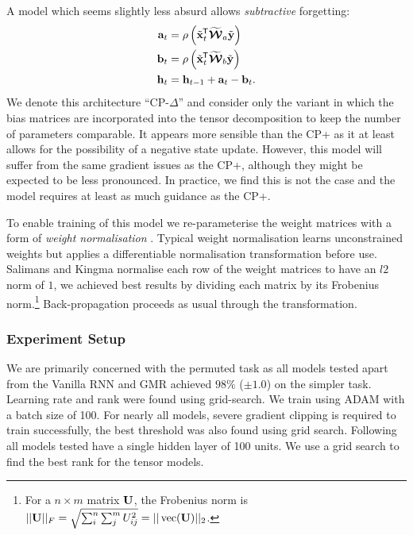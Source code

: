 A model which seems slightly less absurd allows \emph{subtractive} forgetting:
\begin{align}\label{eq:cpdelta}
	\mathbf{a}_t &= \rho\left(\tilde{\mathbf{x}}^{\mkern-1.5mu\mathsf{T}}_t\widetilde{\bm{\mathcal{W}}}_a\tilde{\mathbf{y}}\right)\\
	\mathbf{b}_t &= \rho\left(\tilde{\mathbf{x}}^{\mkern-1.5mu\mathsf{T}}_t\widetilde{\bm{\mathcal{W}}}_b\tilde{\mathbf{y}}\right)\\
	\mathbf{h}_t &= \mathbf{h}_{t-1} + \mathbf{a}_t - \mathbf{b}_t.
\end{align} We denote this architecture ``CP-\(\Delta\)'' and consider only the variant in
which the bias matrices are incorporated into the tensor decomposition to keep the number
of parameters comparable. It appears more sensible
than the CP+ as it at least allows for the possibility of a negative state update.
However, this model will suffer from the same gradient issues as the CP+, although
they might be expected to be less pronounced. In practice, we find this is not the case and
the model requires at least as much guidance as the CP+.

To enable training of this model we re-parameterise the weight matrices with a
form of \emph{weight normalisation} \autocite{Salimans2016a}. Typical
weight normalisation learns unconstrained weights but applies a differentiable
normalisation transformation before use. Salimans and Kingma normalise each
row of the weight matrices to have an \(l2\) norm of \(1\), we achieved
best results by dividing each matrix by its Frobenius norm.\footnote{
For a \(n \times m\) matrix \(\mathbf{U}\), the Frobenius norm is
\(||\mathbf{U}||_F = \sqrt{\sum_i^n\sum_j^mU_{ij}^2} = ||\operatorname{vec}(\mathbf{U})||_2\).}
Back-propagation proceeds as usual through the transformation.

\subsubsection{Experiment Setup}
We are primarily concerned with the permuted task as all models tested apart
from the Vanilla RNN and GMR achieved \(98\%\) (\(\pm 1.0\)) on the simpler task.
Learning rate and rank
were found using grid-search. We train using ADAM with a batch size of 100.
For nearly all models, severe gradient clipping \autocite{Pascanu2013} is
required to train successfully, the best threshold was also found using grid
search.
Following \autocite{Le2015} all models tested have a single hidden layer of 100 units.
We use a grid search to find the best rank for the tensor models.

